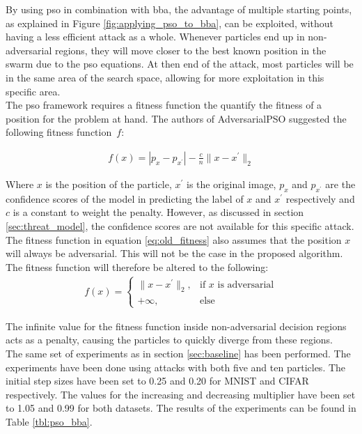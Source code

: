 By using \gls{pso} in combination with \gls{bba}, the advantage of multiple starting points, as explained in Figure \ref{fig:applying_pso_to_bba}, can be exploited, without having a less efficient attack as a whole. Whenever particles end up in non-adversarial regions, they will move closer to the best known position in the swarm due to the \gls{pso} equations. At then end of the attack, most particles will be in the same area of the search space, allowing for more exploitation in this specific area.\\

The \gls{pso} framework requires a fitness function the quantify the fitness of a position for the problem at hand. The authors of AdversarialPSO \cite{mosli2019they} suggested the following fitness function~$f$:

\begin{align}
	f(x) = |p_{x} - p_{x^{\prime}}| - \frac{c}{n}\|x-x^\prime\|_2   \label{eq:old_fitness}
\end{align}

Where $x$ is the position of the particle, $x^\prime$ is the original image, $p_{x}$ and $p_{x^\prime}$ are the confidence scores of the model in predicting the label of $x$ and $x^\prime$ respectively and $c$ is a constant to weight the penalty. However, as discussed in section \ref{sec:threat_model}, the confidence scores are not available for this specific attack. The fitness function in equation \ref{eq:old_fitness} also assumes that the position $x$ will always be adversarial. This will not be the case in the proposed algorithm. The fitness function will therefore be altered to the following:
\begin{align}
	f(x) = 
	\begin{cases}
 		\| x - x^\prime\|_2,	&\text{if } x \text{ is adversarial}\\
 		+\infty, 		& \text{else}
	\end{cases}
\end{align}

The infinite value for the fitness function inside non-adversarial decision regions acts as a penalty, causing the particles to quickly diverge from these regions.\\

The same set of experiments as in section \ref{sec:baseline} has been performed. The experiments have been done using attacks with both five and ten particles. The initial step sizes have been set to 0.25 and 0.20 for MNIST and CIFAR respectively. The values for the increasing and decreasing multiplier have been set to 1.05 and 0.99 for both datasets. The results of the experiments can be found in Table \ref{tbl:pso_bba}.\\

